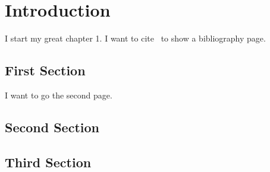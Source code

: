 
\chapter{Introduction}


I start my great chapter 1. I want to cite~\citet{key1} to show a bibliography page.
 
\section{First Section}

I want to go the second page. 

\newpage


\section{Second Section}

\newpage

\section{Third Section}

\cleardoublepage
